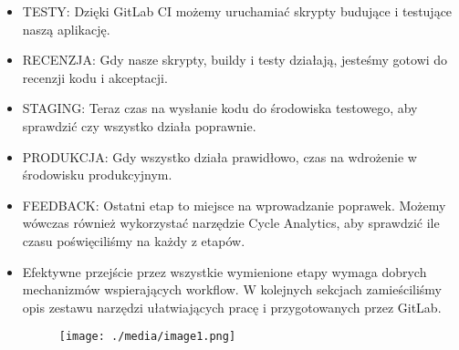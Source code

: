 \documentclass[12pt]{article}
\renewcommand{\_}{\kern-1.5pt\textunderscore\kern-1.5pt}
\begin{document}
\begin{itemize}
\begin{itemize}
\begin{itemize}
	\item TESTY: Dzięki GitLab CI możemy uruchamiać skrypty budujące i testujące naszą aplikację.\par

	\item RECENZJA: Gdy nasze skrypty, buildy i testy działają, jesteśmy gotowi do recenzji kodu i akceptacji.\par

	\item STAGING: Teraz czas na wysłanie kodu do środowiska testowego, aby sprawdzić czy wszystko działa poprawnie.\par

	\item PRODUKCJA: Gdy wszystko działa prawidłowo, czas na wdrożenie w środowisku produkcyjnym.\par

	\item FEEDBACK: Ostatni etap to miejsce na wprowadzanie poprawek. Możemy wówczas również wykorzystać narzędzie Cycle Analytics, aby sprawdzić ile czasu poświęciliśmy na każdy z etapów.\par

	\item Efektywne przejście przez wszystkie wymienione etapy wymaga dobrych mechanizmów wspierających workflow. W kolejnych sekcjach zamieściliśmy opis zestawu narzędzi ułatwiających pracę i przygotowanych przez GitLab.\par




\begin{figure}[H]
	\begin{Center}
		\texttt{[image: ./media/image1.png]}
	\end{Center}
\end{figure}



\par


\vspace{\baselineskip}
\\

\vspace{\baselineskip}
\vspace{\baselineskip}


\end{itemize}
\end{itemize}
\end{itemize}
\end{document}
